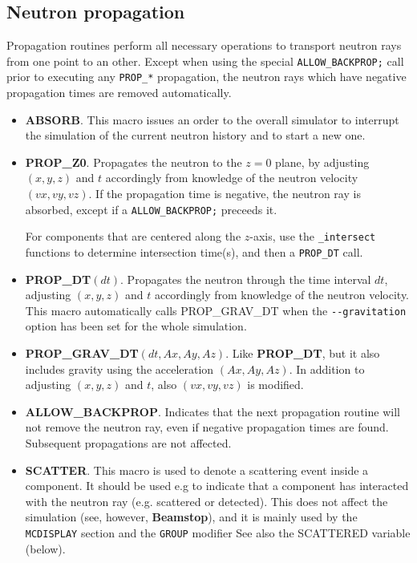 \subsection{Neutron propagation}
Propagation routines perform all necessary operations to transport neutron rays
from one point to an other. Except when using the special
\verb+ALLOW_BACKPROP;+ call prior to executing any \verb+PROP_*+ propagation,
the neutron rays which have negative propagation times are removed automatically.
\begin{itemize}
\item \textbf{ABSORB}. This macro issues an order to the overall
  \MCS simulator to interrupt the simulation of the current neutron
  history and to start a new one.
\item \textbf{PROP\_Z0}. Propagates the neutron to the $z=0$ plane,
  by adjusting $(x,y,z)$ and $t$ accordingly from knowledge of the
  neutron velocity $(vx,vy,vz)$.
  If the propagation time is negative, the neutron ray is absorbed, except if a \verb+ALLOW_BACKPROP;+ preceeds it.

  For components that are centered along the $z$-axis,
  use the \verb+_intersect+ functions to determine intersection time(s),
  and then a \verb+PROP_DT+ call.
\item \textbf{PROP\_DT}$(dt)$. Propagates the neutron through the
  time interval $dt$, adjusting $(x,y,z)$ and $t$ accordingly
  from knowledge of the neutron velocity. This macro automatically calls PROP\_GRAV\_DT when the \verb+--gravitation+ option has been set for the whole simulation.
\item \textbf{PROP\_GRAV\_DT}$(dt,Ax,Ay,Az)$. Like \textbf{PROP\_DT}, but it also
  includes gravity using the acceleration $(Ax,Ay,Az)$. In addition
  to adjusting $(x,y,z)$ and $t$, also $(vx,vy,vz)$ is modified.
\item \textbf{ALLOW\_BACKPROP}. Indicates that the next propagation routine
  will not remove the neutron ray, even if negative propagation times
  are found. Subsequent propagations are not affected.
\item \textbf{SCATTER}. This macro is used to denote a scattering event
  inside a component.
  It should be used e.g
  to indicate that a component has interacted with the neutron ray
  (e.g. scattered or detected).
  This does not affect the simulation (see, however, \textbf{Beamstop}),
  and it is mainly used by the
  \verb+MCDISPLAY+ section and the \verb+GROUP+ modifier
  See also the SCATTERED variable (below).
\end{itemize}

